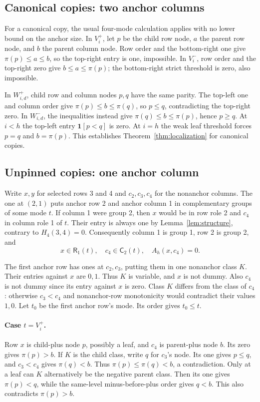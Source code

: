 \documentclass[11pt,a4paper]{article}
\theoremstyle{remark}
\newcommand{\one}{\mathbf{1}}
\newcommand{\Rrole}{\mathsf R}
\newcommand{\Crole}{\mathsf C}
\begin{document}
\subsection{Canonical copies: two anchor columns}
For a canonical copy, the usual four-mode calculation applies with
no lower bound on the anchor size. In \(V_i^+\), let \(p\) be the
child row node, \(a\) the parent row node, and \(b\) the parent column
node. Row order and the bottom-right one give
\(\pi(p)\le a\le b\), so the top-right entry is one, impossible.
In \(V_i^-\), row order and the top-right zero give
\(b\le a\le\pi(p)\); the bottom-right strict threshold is zero,
also impossible.

In \(W_{i,d}^+\), child row and column nodes \(p,q\) have the same
parity. The top-left one and column order give
\(\pi(p)\le b\le\pi(q)\), so \(p\le q\), contradicting the
top-right zero. In \(W_{i,d}^-\), the inequalities instead give
\(\pi(q)\le b\le\pi(p)\), hence \(p\ge q\). At \(i<h\) the
top-left entry \(\one[p<q]\) is zero. At \(i=h\) the weak leaf
threshold forces \(p=q\) and \(b=\pi(p)\). This establishes
Theorem~\ref{thm:localization} for canonical copies.

\subsection{Unpinned copies: one anchor column}
Write \(x,y\) for selected rows 3 and 4 and \(c_2,c_3,c_4\) for
the nonanchor columns. The one at \((2,1)\) puts anchor row 2 and
anchor column 1 in complementary groups of some mode \(t\).
If column 1 were group 2, then \(x\) would be in row role 2 and
\(c_4\) in column role 1 of \(t\). Their entry is always one by
Lemma~\ref{lem:structure}, contrary to \(H_4(3,4)=0\).
Consequently column 1 is group 1, row 2 is group 2, and
\begin{equation}\label{eq:unpinned}
x\in\Rrole_1(t),\quad c_4\in\Crole_2(t),\quad A_h(x,c_4)=0.
\end{equation}

The first anchor row has ones at \(c_2,c_3\), putting them in one
nonanchor class \(K\). Their entries against \(x\) are \(0,1\).
Thus \(K\) is variable, and \(x\) is not dummy. Also \(c_4\)
is not dummy since its entry against \(x\) is zero. Class \(K\)
differs from the class of \(c_4\): otherwise \(c_3<c_4\) and
nonanchor-row monotonicity would contradict their values \(1,0\).
Let \(t_0\) be the first anchor row's mode. Its order gives
\(t_0\le t\).

\paragraph{Case \(t=V_i^+\).}
Row \(x\) is child-plus node \(p\), possibly a leaf, and \(c_4\)
is parent-plus node \(b\). Its zero gives \(\pi(p)>b\).
If \(K\) is the child class, write \(q\) for \(c_3\)'s node.
Its one gives \(p\le q\), and \(c_3<c_4\) gives
\(\pi(q)<b\). Thus \(\pi(p)\le\pi(q)<b\), a contradiction.
Only at a leaf can \(K\) alternatively be the negative parent
class. Then its one gives \(\pi(p)<q\), while the same-level
minus-before-plus order gives \(q<b\). This also contradicts
\(\pi(p)>b\).
\end{document}
